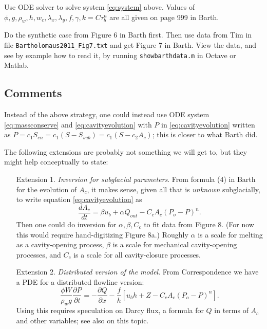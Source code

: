 \documentclass[11pt,final]{amsart}%
\begin{document}
Use ODE solver to solve system \eqref{eq:system} above.  Values of $\phi,g,\rho_w,h,w_c,\lambda_x,\lambda_y,f,\gamma,k=C\tau_b^n$ are all given on page 999 in Barth.

Do the synthetic case from Figure 6 in Barth first.  Then use data from Tim in file \texttt{Bartholomaus2011_Fig7.txt} and get Figure 7 in Barth.  View the data, and see by example how to read it, by running \texttt{showbarthdata.m} in Octave or Matlab.

\subsection*{Comments}  Instead of the above strategy, one could instead use ODE system \eqref{eq:massconserve} and \eqref{eq:cavityevolution} with $P$ in \eqref{eq:cavityevolution} written as $P= c_1 S_{en} = c_1 (S - S_{sub}) = c_1 (S - c_2 A_c)$; this is closer to what Barth did.

The following extensions are probably not something we will get to, but they might help conceptually to state:

\begin{itemize}

\item[Extension 1.\quad] \emph{Inversion for subglacial parameters}.  From formula (4) in Barth for the evolution of $A_c$, it makes sense, given all that is \emph{unknown} subglacially, to write equation \eqref{eq:cavityevolution} as
\begin{equation}
\frac{dA_c}{dt} = \beta u_b + \alpha Q_{out} - C_c A_c (P_o-P)^n. \label{eq:cavityevolutionforinversion}
\end{equation}
Then one could do inversion for $\alpha,\beta,C_c$ to fit data from Figure 8.  (For now this would require hand-digitizing Figure 8a.)  Roughly $\alpha$ is a scale for melting as a cavity-opening process, $\beta$ is a scale for mechanical cavity-opening processes, and $C_c$ is a scale for all cavity-closure processes.

\item[Extension 2.\quad] \emph{Distributed version of the model}.  From Correspondence \citep{Bueler2014correspondence} we have a PDE for a distributed flowline version:
\begin{equation}
\frac{\phi W}{\rho_w g} \frac{\partial P}{\partial t} = - \frac{\partial Q}{\partial x} - \frac{f}{h} \left[u_b h + Z - C_c A_c (P_o-P)^n\right]. \label{eq:barth:distpressure}
\end{equation}
Using this requires speculation on Darcy flux, a formula for $Q$ in terms of $A_c$ and other variables; see also \cite{BuelervanPeltDRAFT} on this topic.

\end{itemize}
\end{document}
